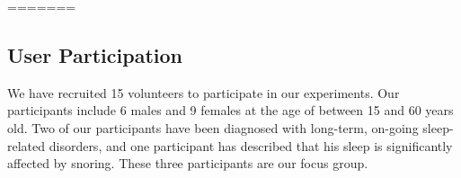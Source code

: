 =======



\subsection{User Participation} We have recruited 15 volunteers to participate in our experiments. Our
participants include 6 males and 9 females at the age of between 15 and 60 years old. Two of our participants have been diagnosed with
long-term, on-going sleep-related disorders, and one participant has described that his sleep is significantly affected by snoring. These
three participants are our focus group.

